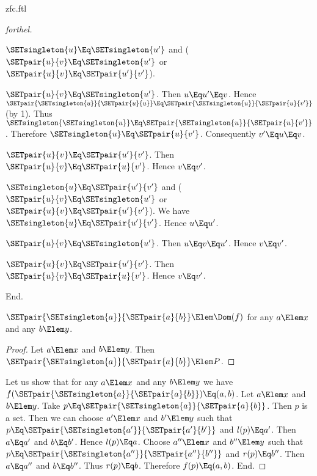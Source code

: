 \documentclass{stex}
\begin{document}
\begin{smodule}{zfc.ftl}
\begin{proof}[forthel]
\begin{case}{$\SETsingleton{u} \Eq \SETsingleton{u'}$ and ($\SETpair{u}{v} \Eq \SETsingleton{u'}$ or $\SETpair{u}{v} \Eq \SETpair{u'}{v'}$).}
      \begin{case}{$\SETpair{u}{v} \Eq \SETsingleton{u'}$.}
        Then $u \Eq u'\Eq v$.
        Hence $\SETpair{\SETsingleton{u}}{\SETpair{u}{u}} \Eq \SETpair{\SETsingleton{u}}{\SETpair{u}{v'}}$ (by 1).
        Thus $\SETsingleton{\SETsingleton{u}} \Eq \SETpair{\SETsingleton{u}}{\SETpair{u}{v'}}$.
        Therefore $\SETsingleton{u} \Eq \SETpair{u}{v'}$.
        Consequently $v' \Eq u \Eq v$.
      \end{case}

      \begin{case}{$\SETpair{u}{v} \Eq \SETpair{u'}{v'}$.}
        Then $\SETpair{u}{v} \Eq \SETpair{u}{v'}$.
        Hence $v \Eq v'$.
      \end{case}
    \end{case}

    \begin{case}{$\SETsingleton{u} \Eq \SETpair{u'}{v'}$ and ($\SETpair{u}{v} \Eq \SETsingleton{u'}$ or $\SETpair{u}{v} \Eq \SETpair{u'}{v'}$).}
      We have $\SETsingleton{u} \Eq \SETpair{u'}{v'}$.
      Hence $u \Eq u'$.

      \begin{case}{$\SETpair{u}{v} \Eq \SETsingleton{u'}$.}
        Then $u \Eq v \Eq u'$.
        Hence $v \Eq v'$.
      \end{case}

      \begin{case}{$\SETpair{u}{v} \Eq \SETpair{u'}{v'}$.}
        Then $\SETpair{u}{v} \Eq \SETpair{u}{v'}$.
        Hence $v \Eq v'$.
      \end{case}
    \end{case}
  End.

  $\SETpair{\SETsingleton{a}}{\SETpair{a}{b}} \Elem \Dom(f)$ for any $a \Elem x$ and any $b \Elem y$. %
  \begin{proof}
    Let $a \Elem x$ and $b \Elem y$.
    Then $\SETpair{\SETsingleton{a}}{\SETpair{a}{b}} \Elem P$.
  \end{proof}

  Let us show that for any $a \Elem x$ and any $b \Elem y$ we have $f(\SETpair{\SETsingleton{a}}{\SETpair{a}{b}}) \Eq (a,b)$.
    Let $a \Elem x$ and $b \Elem y$.
    Take $p \Eq \SETpair{\SETsingleton{a}}{\SETpair{a}{b}}$.
    Then $p$ is a set.
    Then we can choose $a' \Elem x$ and $b' \Elem y$ such that $p \Eq \SETpair{\SETsingleton{a'}}{\SETpair{a'}{b'}}$ and $l(p) \Eq a'$.
    Then $a \Eq a'$ and $b \Eq b'$.
    Hence $l(p) \Eq a$.
    Choose $a'' \Elem x$ and $b'' \Elem y$ such that $p \Eq \SETpair{\SETsingleton{a''}}{\SETpair{a''}{b''}}$ and $r(p) \Eq b''$.
    Then $a \Eq a''$ and $b \Eq b''$.
    Thus $r(p) \Eq b$.
    Therefore $f(p) \Eq (a,b)$.
  End.


\end{proof}
\end{smodule}
\end{document}
